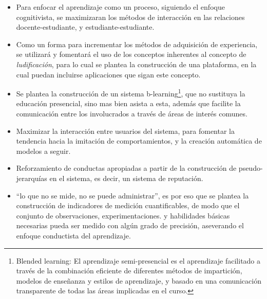 \begin{itemize}
\item Para enfocar el aprendizaje como un proceso, siguiendo el enfoque
cognitivista, se maximizaran los métodos de interacción en las relaciones
docente-estudiante, y estudiante-estudiante.
\item Como un forma para incrementar los métodos de adquisición de experiencia,
se utilizará y fomentará el uso de los conceptos inherentes al concepto de 
\emph{ludificación}, para lo cual se plantea la construcción de una plataforma,
en la cual puedan incluirse aplicaciones que sigan este concepto.
\item Se plantea la construcción de un sistema b-learning\footnote{Blended
learning: El aprendizaje semi-presencial es el aprendizaje facilitado a través
de la combinación eficiente de diferentes métodos de impartición, modelos de
enseñanza y estilos de aprendizaje, y basado en una comunicación transparente
de todas las áreas implicadas en el curso.}, que no sustituya la educación
presencial, sino mas bien asista a esta, además que facilite la comunicación
entre los involucrados a través de áreas de interés comunes.
\item Maximizar la interacción entre usuarios del sistema, para fomentar la
tendencia hacia la imitación de comportamientos, y la creación automática de
modelos a seguir.
\item Reforzamiento de conductas apropiadas a partir de la construcción de
pseudo-jerarquías en el sistema, es decir, un sistema de reputación.
\item ``lo que no se mide, no se puede administrar''\cite{Silva}, es por eso que
se plantea la construcción de indicadores de medición cuantificables, de modo
que el conjunto de observaciones, experimentaciones. y habilidades básicas
necesarias pueda ser medido con algún grado de precisión, aseverando el enfoque
conductista del aprendizaje.
\end{itemize}
